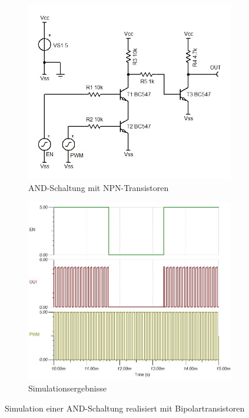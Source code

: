 \begin{figure}[h!]
	\centering
	\begin{subfigure}[b]{0.45\textwidth}
		\includegraphics[width=\textwidth]{src/DC/sim/sch-and-01.jpg}
		\caption{AND-Schaltung mit NPN-Transistoren}
	\end{subfigure}
	\begin{subfigure}[b]{0.45\textwidth}
		\includegraphics[width=\textwidth]{src/DC/sim/and-01.jpg}
		\caption{Simulationsergebnisse}
	\end{subfigure}
	\caption{Simulation einer AND-Schaltung realisiert mit
		Bipolartransistoren}
	\label{fig:and}
\end{figure}

